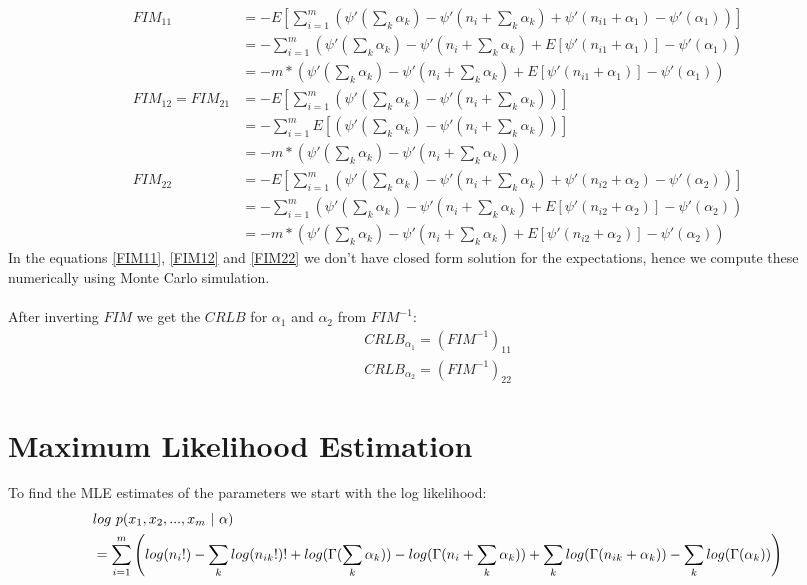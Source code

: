 \documentclass{article} %
\newcommand{\?}{\stackrel{?}{=}}
\begin{document}
\begin{align}
FIM_{11} &= -E\left[\sum\limits_{i=1}^{m} \left({ \psi'(\sum\limits_{k}\alpha_k) - \psi'(n_i+\sum\limits_{k}\alpha_k) + \psi'(n_{i1} + \alpha_1) - \psi'(\alpha_1) }\right)\right]\\
&= -\sum\limits_{i=1}^{m} \left({ \psi'(\sum\limits_{k}\alpha_k) - \psi'(n_i+\sum\limits_{k}\alpha_k) + E\left[\psi'(n_{i1} + \alpha_1)\right] - \psi'(\alpha_1) }\right)\\
&= -m * \left({ \psi'(\sum\limits_{k}\alpha_k) - \psi'(n_i+\sum\limits_{k}\alpha_k) + E\left[\psi'(n_{i1} + \alpha_1)\right] - \psi'(\alpha_1) }\right)\label{FIM11}\\
FIM_{12} = FIM_{21} &= -E\left[\sum\limits_{i=1}^{m} \left({ \psi'(\sum\limits_{k}\alpha_k) - \psi'(n_i+\sum\limits_{k}\alpha_k) }\right)\right]\\
&= -\sum\limits_{i=1}^{m}E\left[ \left({ \psi'(\sum\limits_{k}\alpha_k) - \psi'(n_i+\sum\limits_{k}\alpha_k) }\right)\right]\\
&= -m * \left({ \psi'(\sum\limits_{k}\alpha_k) - \psi'(n_i+\sum\limits_{k}\alpha_k) }\right)\label{FIM12}\\
FIM_{22} &= -E\left[\sum\limits_{i=1}^{m} \left({ \psi'(\sum\limits_{k}\alpha_k) - \psi'(n_i+\sum\limits_{k}\alpha_k) + \psi'(n_{i2} + \alpha_2) - \psi'(\alpha_2) }\right)\right]\\
&= -\sum\limits_{i=1}^{m} \left({ \psi'(\sum\limits_{k}\alpha_k) - \psi'(n_i+\sum\limits_{k}\alpha_k) + E\left[\psi'(n_{i2} + \alpha_2)\right] - \psi'(\alpha_2) }\right)\\
&= -m * \left({ \psi'(\sum\limits_{k}\alpha_k) - \psi'(n_i+\sum\limits_{k}\alpha_k) + E\left[\psi'(n_{i2} + \alpha_2)\right] - \psi'(\alpha_2) }\right)\label{FIM22}
\end{align}
In the equations \ref{FIM11}, \ref{FIM12} and \ref{FIM22} we don't have closed form solution for the expectations, hence we compute these numerically using Monte Carlo simulation.\\
\\
After inverting $FIM$ we get the $CRLB$ for $\alpha_1$ and $\alpha_2$ from $FIM^{-1}$:\\

\begin{align}
CRLB_{\alpha_1}=(FIM^{-1})_{11}\\
CRLB_{\alpha_2}=(FIM^{-1})_{22}
\end{align}


\section{Maximum Likelihood Estimation} \label{ML}
To find the MLE estimates of the parameters we start with the log likelihood:
\begin{align}
&log\ p(x_1,x_2, ..., x_m\ |\ \alpha)\notag\\
&=\sum_{i=1}^{m}{\left( log(n_i!) - \sum_{k}log(n_{ik}!)! + log(\Gamma(\sum_{k}\alpha_k))
- log(\Gamma(n_i+\sum_{k}\alpha_k)) + \sum_{k} log(\Gamma(n_{ik} + \alpha_k)) - \sum_{k} log(\Gamma(\alpha_k)) \right)}\label{loglikelihood}
\end{align}
\end{document}
